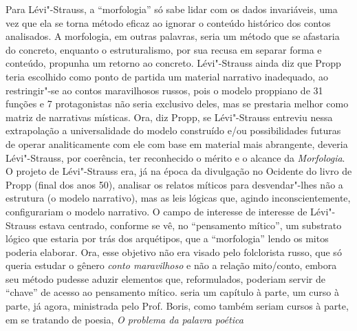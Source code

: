 {  Para Lévi"-Strauss, a ``morfologia'' só sabe lidar com os dados
  invariáveis, uma vez que ela se torna método eficaz ao ignorar o
  conteúdo histórico dos contos analisados. A morfologia, em outras
  palavras, seria um método que se afastaria do concreto, enquanto o
  estruturalismo, por sua recusa em separar forma e conteúdo, propunha
  um retorno ao concreto. Lévi"-Strauss ainda diz que Propp teria
  escolhido como ponto de partida um material narrativo inadequado, ao
  restringir"-se ao contos maravilhosos russos, pois o modelo proppiano
  de 31 funções e 7 protagonistas não seria exclusivo deles, mas se
  prestaria melhor como matriz de narrativas místicas. Ora, diz Propp,
  se Lévi"-Strauss entreviu nessa extrapolação a universalidade do modelo
  construído e/ou possibilidades futuras de operar analiticamente com
  ele com base em material mais abrangente, deveria Lévi"-Strauss, por
  coerência, ter reconhecido o mérito e o alcance da \emph{Morfologia}.
  O projeto de Lévi"-Strauss era, já na época da divulgação no Ocidente
  do livro de Propp (final dos anos 50), analisar os relatos míticos
  para desvendar"-lhes não a estrutura (o modelo narrativo), mas as leis
  lógicas que, agindo inconscientemente, configurariam o modelo
  narrativo. O campo de interesse de interesse de Lévi"-Strauss estava
  centrado, conforme se vê, no ``pensamento mítico'', um substrato
  lógico que estaria por trás dos arquétipos, que a ``morfologia'' lendo
  os mitos poderia elaborar. Ora, esse objetivo não era visado pelo
  folclorista russo, que só queria estudar o gênero \emph{conto
  maravilhoso} e não a relação mito/conto, embora seu método pudesse
  aduzir elementos que, reformulados, poderiam servir de ``chave'' de
  acesso ao pensamento mítico.} seria um capítulo à parte, um curso à
parte, já agora, ministrada pelo Prof. Boris, como também seriam cursos
à parte, em se tratando de poesia, \emph{O problema da palavra poética}
